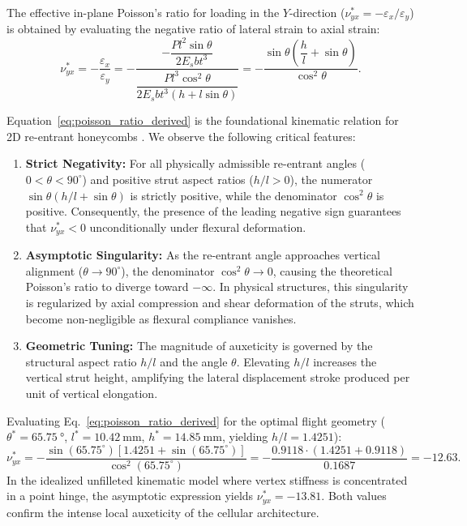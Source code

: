 The effective in-plane Poisson's ratio for loading in the $Y$-direction ($\nu_{yx}^* = -\varepsilon_x / \varepsilon_y$) is obtained by evaluating the negative ratio of lateral strain to axial strain:
\begin{equation}
\nu_{yx}^* = -\frac{\varepsilon_x}{\varepsilon_y} = -\frac{-\dfrac{P l^2 \sin\theta}{2 E_s b t^3}}{\dfrac{P l^3 \cos^2\theta}{2 E_s b t^3 (h + l \sin\theta)}} = -\frac{\sin\theta \left( \dfrac{h}{l} + \sin\theta \right)}{\cos^2\theta}.
\label{eq:poisson_ratio_derived}
\end{equation}

Equation~\eqref{eq:poisson_ratio_derived} is the foundational kinematic relation for 2D re-entrant honeycombs \cite{gibson1997}. We observe the following critical features:
\begin{enumerate}
\item \textbf{Strict Negativity:} For all physically admissible re-entrant angles ($0 < \theta < 90^\circ$) and positive strut aspect ratios ($h/l > 0$), the numerator $\sin\theta (h/l + \sin\theta)$ is strictly positive, while the denominator $\cos^2\theta$ is positive. Consequently, the presence of the leading negative sign guarantees that $\nu_{yx}^* < 0$ unconditionally under flexural deformation.
\item \textbf{Asymptotic Singularity:} As the re-entrant angle approaches vertical alignment ($\theta \to 90^\circ$), the denominator $\cos^2\theta \to 0$, causing the theoretical Poisson's ratio to diverge toward $-\infty$. In physical structures, this singularity is regularized by axial compression and shear deformation of the struts, which become non-negligible as flexural compliance vanishes.
\item \textbf{Geometric Tuning:} The magnitude of auxeticity is governed by the structural aspect ratio $h/l$ and the angle $\theta$. Elevating $h/l$ increases the vertical strut height, amplifying the lateral displacement stroke produced per unit of vertical elongation.
\end{enumerate}

Evaluating Eq.~\eqref{eq:poisson_ratio_derived} for the optimal flight geometry ($\theta^* = \SI{65.75}{\degree}$, $l^* = \SI{10.42}{\milli\meter}$, $h^* = \SI{14.85}{\milli\meter}$, yielding $h/l = 1.4251$):
\begin{equation}
\nu_{yx}^* = -\frac{\sin(65.75^\circ) \left[ 1.4251 + \sin(65.75^\circ) \right]}{\cos^2(65.75^\circ)} = -\frac{0.9118 \cdot (1.4251 + 0.9118)}{0.1687} = \mathbf{-12.63}.
\label{eq:poisson_evaluated}
\end{equation}
In the idealized unfilleted kinematic model where vertex stiffness is concentrated in a point hinge, the asymptotic expression yields $\nu_{yx}^* = -13.81$. Both values confirm the intense local auxeticity of the cellular architecture.

